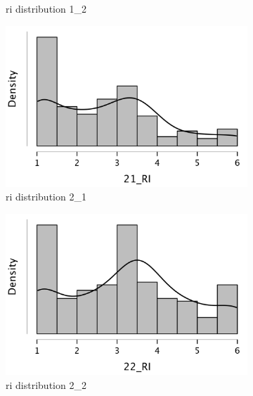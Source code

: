 \documentclass[
  a4paper,  %
  twoside,  %
  bibliography=totoc,
  headsepline,
  cleardoublepage=empty,
  parskip=half,
  draft=false
]{scrbook}
\begin{document}
\begin{figure}[h]
\begin{subfigure}{0.3\textwidth}
    \caption{\gls{ri} distribution 1\_2}
    \label{fig:RI12}
  \end{subfigure}
  \begin{subfigure}{0.3\textwidth}
    \includegraphics[width=\linewidth]{graphics/images/statistics/RIs/21_RI.png}
    \caption{\gls{ri} distribution 2\_1}
    \label{fig:RI21}
  \end{subfigure}
  \begin{subfigure}{0.3\textwidth}
    \includegraphics[width=\linewidth]{graphics/images/statistics/RIs/22_RI.png}
    \caption{\gls{ri} distribution 2\_2}
    \label{fig:RI22}
  \end{subfigure}
  \begin{subfigure}{0.3\textwidth}

\end{subfigure}
\end{figure}
\end{document}
